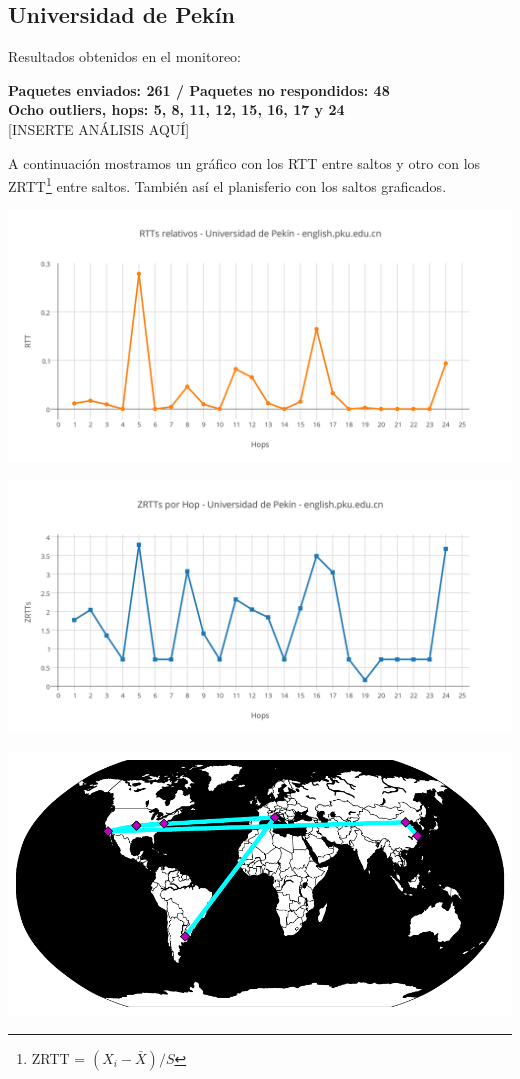 \subsection{Universidad de Pekín}

Resultados obtenidos en el monitoreo:\\

\smallskip

\bigskip

\textbf{Paquetes enviados: 261 / Paquetes no respondidos: 48}\\

\textbf{Ocho outliers, hops: 5, 8, 11, 12, 15, 16, 17 y 24}\\

[INSERTE ANÁLISIS AQUÍ]

A continuación mostramos un gráfico con los RTT entre saltos y otro con los ZRTT\footnote{ZRTT = $(X_i - \bar{X}) / S$}  entre saltos. También así el planisferio con los saltos graficados.

\includegraphics[scale=0.65]{imagenes/pekin/RTTs.png} 

\includegraphics[scale=0.65]{imagenes/pekin/ZRTTs.png} 

\begin{center}
\includegraphics[scale=0.8]{imagenes/pekin/pekin.pdf} 
\end{center}
